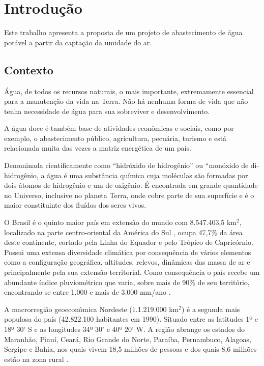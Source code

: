 \chapter[Introdução]{Introdução}

Este trabalho apresenta a proposta de um projeto de abastecimento de água potável a partir da captação da umidade do ar.

\section{Contexto}

Água, de todos os recursos naturais, o mais importante, extremamente essencial para a manutenção da vida na Terra.
Não há nenhuma forma de vida que não tenha necessidade de água para sua sobreviver e desenvolvimento. 

A água doce é também base de atividades econômicas e sociais, como por exemplo, o abastecimento público, agricultura,
pecuária, turismo e está relacionada muita das vezes a matriz energética de um país. 

Denominada cientificamente como “hidróxido de hidrogênio” ou “monóxido de di-hidrogênio, a água é uma substância química
cuja moléculas são formadas por dois átomos de hidrogênio e um de oxigênio. É encontrada em grande quantidade no Universo,
inclusive no planeta Terra, onde cobre parte de sua superfície e é o maior constituinte dos fluídos dos seres vivos. 

O Brasil é o quinto maior país em extensão do mundo com 8.547.403,5 km$^2$,
localizado na parte centro-oriental da América do Sul , ocupa 47,7\%  da área deste continente, cortado pela Linha do Equador
e pelo Trópico de Capricórnio. Possui uma extensa diversidade climática por consequência de vários elementos como a configuração
geográfica, altitudes, relevos, dinâmicas das massa de ar e principalmente pela sua extensão territorial. 
Como consequência o país recebe um abundante índice pluviométrico que varia, sobre mais de 90\% de seu território,
encontrando-se entre 1.000 e mais de 3.000 mm/ano \cite{reboucas03}.

A macrorregião geoeconômica Nordeste (1.1.219.000 km$^2$) é a segunda mais populosa do país (42.822.100 habitantes em 1990). 
Situado entre 	as latitudes 1º e 18º 30’ S e as longitudes 34º 30’ e 40º 20’ W.
A região abrange os estados do Maranhão, Piauí, Ceará, Rio Grande do Norte, Paraíba, Pernambuco, Alagoas, Sergipe e Bahia, nos
quais vivem 18,5 milhões de pessoas e dos quais 8,6 milhões estão na zona rural \cite{cirilo}.


